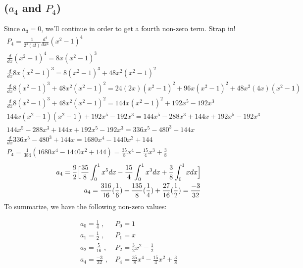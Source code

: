 \documentclass{article}
\begin{document}
\subsection*{\textbf{($a_4$ and $P_4$)}}
Since $a_3=0$, we'll continue in order to get a fourth non-zero term. Strap in!
\begin{equation}
\begin{aligned}
P_4 = \frac{1}{2^4(4!)}\frac{d^4}{dx^4}(x^2-1)^4\\
\frac{d}{dx}(x^2-1)^4 = 8x(x^2-1)^3\\
\frac{d}{dx} 8x(x^2-1)^3 = 8(x^2-1)^3+48x^2(x^2-1)^2\\
\frac{d}{dx} 8(x^2-1)^3+48x^2(x^2-1)^2 = 24(2x)(x^2-1)^2 + 96x(x^2-1)^2 + 48x^2(4x)(x^2-1)\\
\frac{d}{dx} 8(x^2-1)^3+48x^2(x^2-1)^2 = 144x(x^2-1)^2+192x^5-192x^3\\
144x(x^2-1)(x^2-1)+192x^5-192x^3 = 144x^5-288x^3+144x+192x^5-192x^3\\
144x^5-288x^3+144x+192x^5-192x^3 = 336x^5 - 480^3 + 144x\\
\frac{d}{dx}336x^5 - 480^3 + 144x=1680x^4 - 1440x^2+144\\
P_4 = \frac{1}{384}(1680x^4 - 1440x^2+144) = \frac{35}{8}x^4 - \frac{15}{4}x^3+\frac{3}{8}
\end{aligned}
\end{equation}
\begin{equation}
\begin{aligned}
a_4 = \frac{9}{2} \Big{[} \frac{35}{8}\int_0^1x^5dx - \frac{15}{4}\int_0^1x^3dx +\frac{3}{8}\int_0^1xdx \Big{]}\\
a_4 =\frac{316}{16}(\frac{1}{6}) - \frac{135}{8}(\frac{1}{4}) + \frac{27}{16}(\frac{1}{2}) = \frac{-3}{32}
\end{aligned}
\end{equation}
To summarize, we have the following non-zero values:
\begin{tcolorbox}[minipage,colback=white,arc=0pt,outer arc=0pt]
\begin{equation}
\begin{aligned}
a_0 = \frac{1}{4}\text{ , } & P_0 = 1\\
a_1 = \frac{1}{2}\text{ , } & P_1 = x\\
a_2 = \frac{5}{16}\text{ , } & P_2 = \frac{3}{2}x^2-\frac{1}{2}\\
a_4 = \frac{-3}{32}\text{ , } & P_4 = \frac{35}{8}x^4 - \frac{15}{4}x^2 +\frac{3}{8}\\
\end{aligned}
\end{equation}
\end{tcolorbox}
\end{document}
